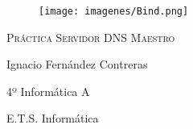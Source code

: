 \documentclass{article}
\begin{document}
\begin{titlepage}
\centering
\begin{figure}
\centering
 
\vspace{5cm}
\centering
\begin{Huge}
\begin{center}

\texttt{[image: imagenes/Bind.png]} 

\vspace{2cm}
\end{center}

\end{Huge}
\end{figure}


 {\scshape\Large Práctica Servidor DNS Maestro\par}
\vspace{8cm}

{\Large Ignacio Fernández Contreras\par}
{\Large 4º Informática A\par}
\vspace{0.5cm}
{\large E.T.S. Informática}
\vfill

\end{titlepage}
\clearpage\hbox{}\thispagestyle{empty}\newpage


 \newpage
\end{document}
